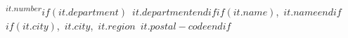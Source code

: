 \normalsize\textsuperscript{$it.number$}$if(it.department)$~$it.department$$endif$$if(it.name)$,~$it.name$$endif$$if(it.city)$,~$it.city$,~$it.region$~$it.postal-code$$endif$